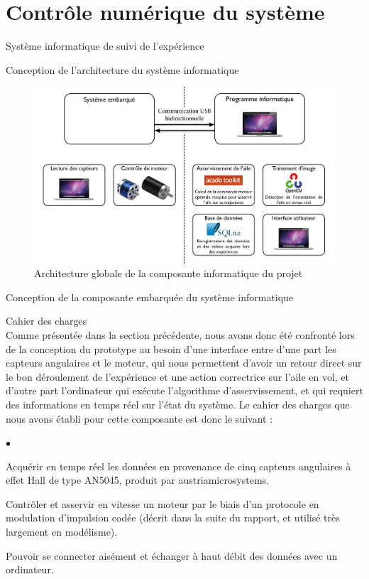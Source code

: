 \documentclass[a4paper,twoside,12pt]{article}
\newcounter{partie}
\newcounter{sous-partie}
\newenvironment{partie}[1]
{
\section{#1}
}
{

}
\newenvironment{sous-partie}[1]
{
\subsection{#1}
}
{

}
\newenvironment{sous-sous-partie}[1]
{
\subsubsection{#1}
}
{

}
\newenvironment{liste}
{
\vspace{0.2cm}
\begin{list}{$\bullet$\hspace{0.3cm}}{\leftmargin=1.4cm}
}
{
\end{list}
\vspace{0.2cm}
}
\begin{document}
\begin{partie}{Contrôle numérique du système}
\begin{sous-partie}{Système informatique de suivi de l'expérience}
\begin{sous-sous-partie}{Conception de l'architecture du système informatique}
\begin{figure}[htb]
	\centering
	\includegraphics[width=\linewidth]{./images/architecture_logicielle.jpg}
	\caption{Architecture globale de la composante informatique du projet}
	\label{archinfo}
\end{figure}

\end{sous-sous-partie}

\begin{sous-sous-partie}{Conception de la composante embarquée du système informatique}

\begin{paragraph}{Cahier des charges\vspace{0.3cm}\\}
Comme présentée dans la section précédente, nous avons donc été confronté lors de la conception du prototype au besoin d'une interface entre d'une part les capteurs angulaires et le moteur, qui nous permettent d'avoir un retour direct sur le bon déroulement de l'expérience et une action correctrice sur l'aile en vol, et d'autre part l'ordinateur qui exécute l'algorithme d'asservissement, et qui requiert des informations en temps réel sur l'état du système. %
Le cahier des charges que nous avons établi pour cette composante est donc le suivant :
\begin{liste}
\item Acquérir en temps réel les données en provenance de cinq capteurs angulaires à effet Hall de type AN5045, produit par austriamicrosystems.
\item Contrôler et asservir en vitesse un moteur par le biais d'un protocole en modulation d'impulsion codée (décrit dans la suite du rapport, et utilisé très largement en modélisme).
\item Pouvoir se connecter aisément et échanger à haut débit des données avec un ordinateur.
\end{liste}
\end{paragraph}


\end{sous-sous-partie}
\end{sous-partie}
\end{partie}
\end{document}
